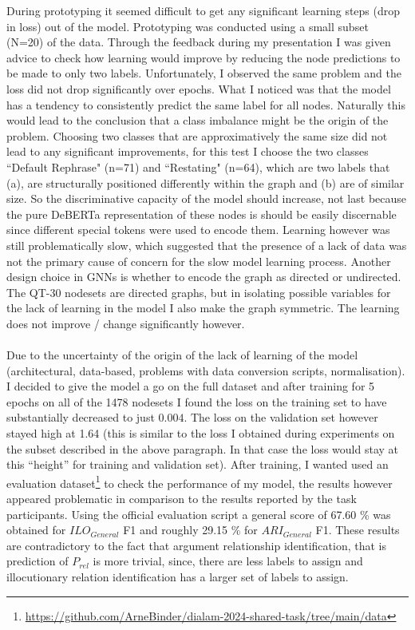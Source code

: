 \documentclass[11pt]{article}
\begin{document}
During prototyping it seemed difficult to get any significant learning steps (drop in loss) out of the model. Prototyping was conducted using a small subset (N=20) of the data. Through the feedback during my presentation I was given advice to check how learning would improve by reducing the node predictions to be made to only two labels. Unfortunately, I observed the same problem and the loss did not drop significantly over epochs. What I noticed was that the model has a tendency to consistently predict the same label for all nodes. Naturally this would lead to the conclusion that a class imbalance might be the origin of the problem. Choosing two classes that are approximatively the same size did not lead to any significant improvements, for this test I choose the two classes ``Default Rephrase" (n=71) and ``Restating" (n=64), which are two labels that (a), are structurally positioned differently within the graph and (b) are of similar size. So the discriminative capacity of the model should increase, not last because the pure DeBERTa representation of these nodes is should be easily discernable since different special tokens were used to encode them. Learning however was still problematically slow, which suggested that the presence of a lack of data was not the primary cause of concern for the slow model learning process. Another design choice in GNNs is whether to encode the graph as directed or undirected. The QT-30 nodesets are directed graphs, but in isolating possible variables for the lack of learning in the model I also make the graph symmetric. The learning does not improve / change significantly however. \\
\\
Due to the uncertainty of the origin of the lack of learning of the model (architectural, data-based, problems with data conversion scripts, normalisation). I decided to give the model a go on the full dataset and after training for 5 epochs on all of the 1478 nodesets I found the loss on the training set to have substantially decreased to just $0.004$. The loss on the validation set however stayed high at 1.64 (this is similar to the loss I obtained during experiments on the subset described in the above paragraph. In that case the loss would stay at this ``height'' for training and validation set).  After training, I wanted used an evaluation dataset\footnote{\url{https://github.com/ArneBinder/dialam-2024-shared-task/tree/main/data}} to check the performance of my model, the results however appeared problematic in comparison to the results reported by the task participants. Using the official evaluation script a general score of 67.60 \% was obtained for $ILO_{General}$ F1 and roughly 29.15 \% for $ARI_{General}$ F1. These results are contradictory to the fact that argument relationship identification, that is prediction of $P_{rel}$ is more trivial, since, there are less labels to assign and illocutionary relation identification has a larger set of labels to assign.  \\
\end{document}

